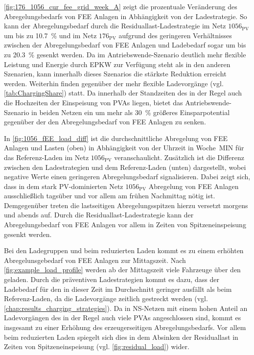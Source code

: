 

\autoref{fig:176_1056_cur_fee_grid_week_A} zeigt die prozentuale Veränderung des Abregelungsbedarfs von \gls{FEE} Anlagen in Abhängigkeit von der Ladestrategie.
So kann der Abregelungsbedarf durch die Residuallast-Ladestrategie im Netz \(1056_{\text{PV}}\) um bis zu \SI{10.7}{\percent} und im Netz \(176_{\text{PV}}\) aufgrund des geringeren Verhältnisses zwischen der Abregelungsbedarf von \gls{FEE} Anlagen und Ladebedarf sogar um bis zu \SI{20.3}{\percent} gesenkt werden.
Da im Antriebswende-Szenario deutlich mehr flexible Leistung und Energie durch \gls{EPKW} zur Verfügung steht als in den anderen Szenarien, kann innerhalb dieses Szenarios die stärkste Reduktion erreicht werden.
Weiterhin finden gegenüber der \SzeFirmenparkplatz mehr flexible Ladevorgänge (vgl. \autoref{tab:ChargingShare}) statt.
Da innerhalb der Standzeiten des \UC \Firmeparkplatz in der Regel auch die Hochzeiten der Einspeisung von \glspl{PVA} liegen, bietet das Antriebswende-Szenario in beiden Netzen ein um mehr als \SI{30}{\percent} größeres Einsparpotential gegenüber der \SzeFirmenparkplatz den Abregelungsbedarf von \gls{FEE} Anlagen zu senken.




In \autoref{fig:1056_fEE_load_diff} ist die durchschnittliche Abregelung von \gls{FEE} Anlagen und Lasten (oben) in Abhängigkeit von der Uhrzeit in Woche~MIN für das Referenz-Laden im Netz \(1056_{\text{PV}}\) veranschaulicht.
Zusätzlich ist die Differenz zwischen den Ladestrategien und dem Referenz-Laden (unten) dargestellt, wobei negative Werte einen geringeren Abregelungsbedarf signalisieren.
Dabei zeigt sich, dass in dem stark \gls{PV}-dominierten Netz \(1056_{\text{PV}}\) Abregelung von \gls{FEE} Anlagen ausschließlich tagsüber und vor allem am frühen Nachmittag nötig ist.
Demgegenüber treten die lastseitigen Abregelungsspitzen hierzu versetzt morgens und abends auf.
Durch die Residuallast-Ladestrategie kann der Abregelungsbedarf von \gls{FEE} Anlagen vor allem in Zeiten von Spitzeneinspeisung gesenkt werden.\medskip

Bei den Ladegruppen und beim reduzierten Laden kommt es zu einem erhöhten Abregelunsgebedarf von \gls{FEE} Anlagen zur Mittagszeit.
Nach \autoref{fig:example_load_profile} werden ab der Mittagszeit viele Fahrzeuge über den \UC \zH geladen.
Durch die präventiven Ladestrategien kommt es dazu, dass der Ladebedarf für den \UC \zH in dieser Zeit im Durchschnitt geringer ausfällt als beim Referenz-Laden, da die Ladevorgänge zeitlich gestreckt werden (vgl. \autoref{chap:results_charging_strategies}).
Da in \gls{NS}-Netzen mit einem hohen Anteil an Ladevorgängen des \UC \zH in der Regel auch viele \glspl{PVA} angeschlossen sind, kommt es insgesamt zu einer Erhöhung des erzeugerseitigen Abregelungsbedarfs.
Vor allem beim reduzierten Laden spiegelt sich dies in dem Absinken der Residuallast in Zeiten von Spitzeneinspeisung (vgl. \autoref{fig:residual_load}) wider.

